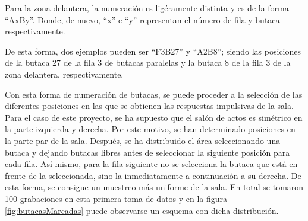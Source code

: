 \documentclass[11pt,a4paper,twoside]{book}
\begin{document}
		    Para la zona delantera, la numeración es ligéramente distinta y es de la forma ``AxBy''. Donde, de nuevo, ``x'' e ``y'' representan el número de fila y butaca respectivamente.

		    De esta forma, dos ejemplos pueden ser ``F3B27'' y ``A2B8''; siendo las posiciones de la butaca 27 de la fila 3 de butacas paralelas y la butaca 8 de la fila 3 de la zona delantera, respectivamente.

		    Con esta forma de numeración de butacas, se puede proceder a la selección de las diferentes posiciones en las que se obtienen las respuestas impulsivas de la sala. Para el caso de este proyecto, se ha supuesto que el salón de actos es simétrico en la parte izquierda y derecha. Por este motivo, se han determinado posiciones en la parte par de la sala. Después, se ha distribuido el área seleccionando una butaca y dejando butacas libres antes de seleccionar la siguiente posición para cada fila. Así mismo, para la fila siguiente no se selecciona la butaca que está en frente de la seleccionada, sino la inmediatamente a continuación a su derecha. De esta forma, se consigue un muestreo más uniforme de la sala. En total se tomaron 100 grabaciones en esta primera toma de datos y en la figura \ref{fig:butacasMarcadas} puede observarse un esquema con dicha distribución. 
		
\end{document}

